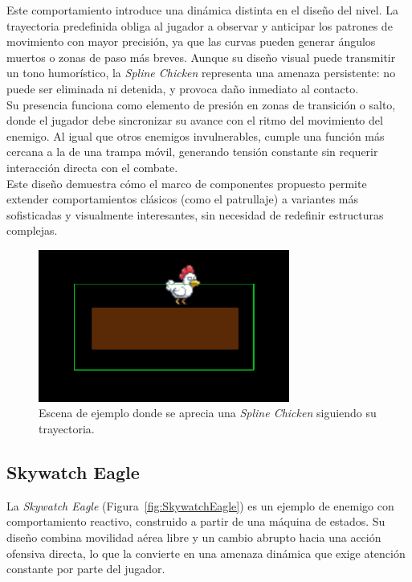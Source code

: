 Este comportamiento introduce una dinámica distinta en el diseño del nivel. La trayectoria predefinida obliga al jugador a observar y anticipar los patrones de movimiento con mayor precisión, ya que las curvas pueden generar ángulos muertos o zonas de paso más breves. Aunque su diseño visual puede transmitir un tono humorístico, la \textit{Spline Chicken} representa una amenaza persistente: no puede ser eliminada ni detenida, y provoca daño inmediato al contacto.\\

Su presencia funciona como elemento de presión en zonas de transición o salto, donde el jugador debe sincronizar su avance con el ritmo del movimiento del enemigo. Al igual que otros enemigos invulnerables, cumple una función más cercana a la de una trampa móvil, generando tensión constante sin requerir interacción directa con el combate.\\

Este diseño demuestra cómo el marco de componentes propuesto permite extender comportamientos clásicos (como el patrullaje) a variantes más sofisticadas y visualmente interesantes, sin necesidad de redefinir estructuras complejas.\\

\begin{figure}[t]
	\centering
	\includegraphics[height=5cm]{Imagenes/SplineFollowerActuator.png}
	\caption{Escena de ejemplo donde se aprecia una \textit{Spline Chicken} siguiendo su trayectoria.}
	\label{fig:SplineChicken}
\end{figure}

\subsection{Skywatch Eagle}

La \textit{Skywatch Eagle} (Figura~\ref{fig:SkywatchEagle}) es un ejemplo de enemigo con comportamiento reactivo, construido a partir de una máquina de estados. Su diseño combina movilidad aérea libre y un cambio abrupto hacia una acción ofensiva directa, lo que la convierte en una amenaza dinámica que exige atención constante por parte del jugador.\\

